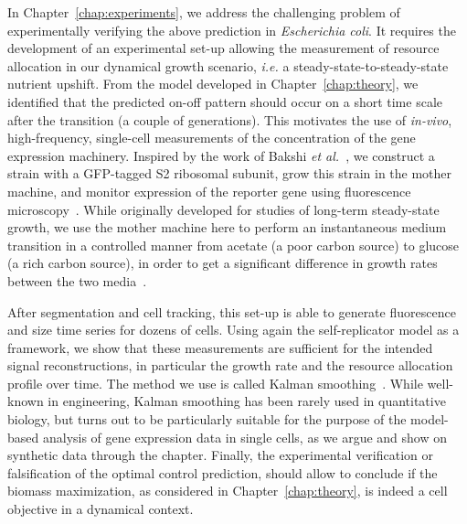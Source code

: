 In Chapter~\ref{chap:experiments}, we address the challenging problem of experimentally verifying the above prediction in \textit{Escherichia coli}.
It requires the development of an experimental set-up allowing the measurement of resource allocation in our dynamical growth scenario, \textit{i.e.} a steady-state-to-steady-state nutrient upshift.
From the model developed in Chapter~\ref{chap:theory}, we identified that the predicted on-off pattern should occur on a short time scale after the transition (a couple of generations).
This motivates the use of \textit{in-vivo}, high-frequency, single-cell measurements of the concentration of the gene expression machinery.
Inspired by the work of Bakshi \textit{et al.}~\cite{bakshi_superresolution_2012}, we construct a strain with a GFP-tagged S2 ribosomal subunit, grow this strain in the mother machine, and monitor expression of the reporter gene using fluorescence microscopy~\cite{wang_robust_2010}.
While originally developed for studies of long-term steady-state growth, we use the mother machine here to perform an instantaneous medium transition in a controlled manner from acetate (a poor carbon source) to glucose (a rich carbon source), in order to get a significant difference in growth rates between the two media~\cite{andersen_are_1980}.

After segmentation and cell tracking, this set-up is able to generate fluorescence and size time series for dozens of cells.
Using again the self-replicator model as a framework, we show that these measurements are sufficient for the intended signal reconstructions, in particular the growth rate and the resource allocation profile over time.
The method we use is called Kalman smoothing~\cite{kailath_linear_2000,jazwinski_stochastic_2007}.
While well-known in engineering, Kalman smoothing has been rarely used in quantitative biology, but turns out to be particularly suitable for the purpose of the model-based analysis of gene expression data in single cells, as we argue and show on synthetic data through the chapter.
Finally, the experimental verification or falsification of the optimal control prediction, should allow to conclude if the biomass maximization, as considered in Chapter~\ref{chap:theory}, is indeed a cell objective in a dynamical context.